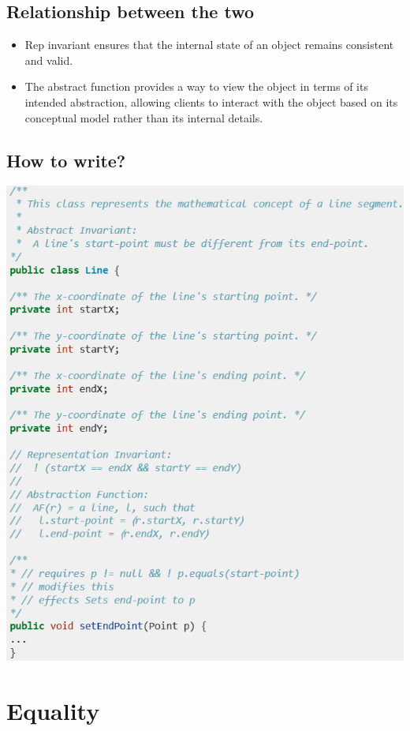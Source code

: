 \documentclass[letterpaper,12pt]{article}
\begin{document}
\subsection{Relationship between the two}
\begin{itemize}
      \item Rep invariant ensures that the internal state of an object remains consistent
            and valid.
      \item The abstract function provides a way to view the object in terms of its
            intended abstraction, allowing clients to interact with the object based on
            its conceptual model rather than its internal details.
\end{itemize}

\subsection{How to write?}
\includegraphics*[scale = 0.9]{./summary_image/RI and AF example.png}

\section{Equality}
\end{document}
